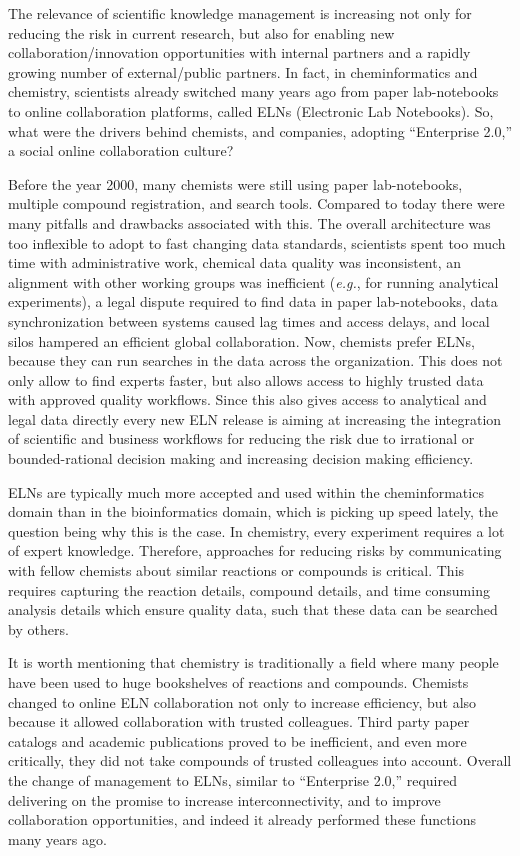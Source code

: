 \documentclass{sig-alternate}
\begin{document}
The relevance of scientific knowledge management is increasing not
only for reducing the risk in current research, but also for enabling
new collaboration/innovation opportunities with internal partners and
a rapidly growing number of external/public partners. In fact, in
cheminformatics and chemistry, scientists already switched many years
ago from paper lab-notebooks to online collaboration platforms, called
ELNs (Electronic Lab Notebooks). So, what were the drivers behind
chemists, and companies, adopting ``Enterprise 2.0,'' a social online
collaboration culture?

Before the year 2000, many chemists were still using paper
lab-notebooks, multiple compound registration, and search
tools. Compared to today there were many pitfalls and drawbacks
associated with this. The overall architecture was too inflexible to
adopt to fast changing data standards, scientists spent too much time
with administrative work, chemical data quality was inconsistent, an
alignment with other working groups was inefficient (\emph{e.g.}, for
running analytical experiments), a legal dispute required to find data
in paper lab-notebooks, data synchronization between systems caused
lag times and access delays, and local silos hampered an efficient
global collaboration. Now, chemists prefer ELNs, because they can run
searches in the data across the organization. This does not only allow
to find experts faster, but also allows access to highly trusted data
with approved quality workflows. Since this also gives access to
analytical and legal data directly every new ELN release is aiming at
increasing the integration of scientific and business workflows for
reducing the risk due to irrational or bounded-rational decision
making and increasing decision making efficiency.

ELNs are typically much more accepted and used within the
cheminformatics domain than in the bioinformatics domain, which is
picking up speed lately, the question being why this is the case. In
chemistry, every experiment requires a lot of expert
knowledge. Therefore, approaches for reducing risks by communicating
with fellow chemists about similar reactions or compounds is
critical. This requires capturing the reaction details, compound
details, and time consuming analysis details which ensure quality
data, such that these data can be searched by others.

It is worth mentioning that chemistry is traditionally a field where many people
have been used to huge bookshelves of reactions and compounds. Chemists changed
to online ELN collaboration not only to increase efficiency, but also
because it allowed collaboration with trusted colleagues. Third party paper
catalogs and academic publications proved to be
inefficient, and even more critically, they did not take compounds of trusted
colleagues into account. Overall the change of management to ELNs, similar to
``Enterprise 2.0,'' required delivering on the promise to increase
interconnectivity, and to improve collaboration
opportunities, and indeed it already performed these functions many years ago.
\end{document}

